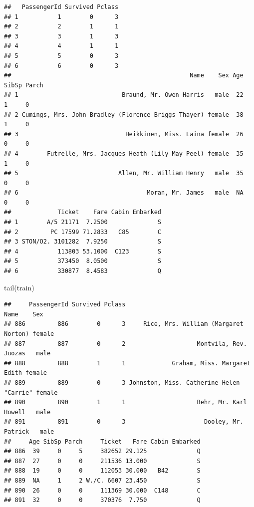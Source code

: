 \documentclass[
]{article}
\newenvironment{Shaded}{\begin{snugshade}}{\end{snugshade}}
\newcommand{\KeywordTok}[1]{\textcolor[rgb]{0.94,0.87,0.69}{#1}}
\newcommand{\NormalTok}[1]{\textcolor[rgb]{0.80,0.80,0.80}{#1}}
\begin{document}
\begin{verbatim}
##   PassengerId Survived Pclass
## 1           1        0      3
## 2           2        1      1
## 3           3        1      3
## 4           4        1      1
## 5           5        0      3
## 6           6        0      3
##                                                  Name    Sex Age SibSp Parch
## 1                             Braund, Mr. Owen Harris   male  22     1     0
## 2 Cumings, Mrs. John Bradley (Florence Briggs Thayer) female  38     1     0
## 3                              Heikkinen, Miss. Laina female  26     0     0
## 4        Futrelle, Mrs. Jacques Heath (Lily May Peel) female  35     1     0
## 5                            Allen, Mr. William Henry   male  35     0     0
## 6                                    Moran, Mr. James   male  NA     0     0
##             Ticket    Fare Cabin Embarked
## 1        A/5 21171  7.2500              S
## 2         PC 17599 71.2833   C85        C
## 3 STON/O2. 3101282  7.9250              S
## 4           113803 53.1000  C123        S
## 5           373450  8.0500              S
## 6           330877  8.4583              Q
\end{verbatim}

\begin{Shaded}
\begin{Highlighting}[]
\KeywordTok{tail}\NormalTok{(train)}
\end{Highlighting}
\end{Shaded}

\begin{verbatim}
##     PassengerId Survived Pclass                                     Name    Sex
## 886         886        0      3     Rice, Mrs. William (Margaret Norton) female
## 887         887        0      2                    Montvila, Rev. Juozas   male
## 888         888        1      1             Graham, Miss. Margaret Edith female
## 889         889        0      3 Johnston, Miss. Catherine Helen "Carrie" female
## 890         890        1      1                    Behr, Mr. Karl Howell   male
## 891         891        0      3                      Dooley, Mr. Patrick   male
##     Age SibSp Parch     Ticket   Fare Cabin Embarked
## 886  39     0     5     382652 29.125              Q
## 887  27     0     0     211536 13.000              S
## 888  19     0     0     112053 30.000   B42        S
## 889  NA     1     2 W./C. 6607 23.450              S
## 890  26     0     0     111369 30.000  C148        C
## 891  32     0     0     370376  7.750              Q
\end{verbatim}
\end{document}
